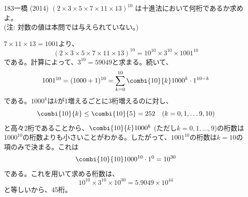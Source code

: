 \begin{prob}{183}{}{一橋 (2014)}
 $(2\times3\times5\times7\times11\times13)^{10}$ は十進法において何桁であるか求めよ。 \\
 (注: 対数の値は本問では与えられていない。)
\end{prob}
$7\times11\times13=1001$より、
\[ (2\times3\times5\times7\times11\times13)^{10}=10^{10}\times3^{10}\times1001^{10} \]
である。計算によって、$3^{10}=59049$と求まる。続いて、
\begin{align*}
 1001^{10}=(1000+1)^{10}=\sum_{k=0}^{10} \combi{10}{k}1000^k\cdot1^{10-k}
\end{align*}
である。$1000^k$は$k$が1増えるごとに3桁増えるのに対し、
\[ \combi{10}{k}\le \combi{10}{5}=252 \quad(k=0,1,\dots 9,10) \]
と高々2桁であることから、$\combi{10}{k}1000^k$ (ただし$k=0,1,\dots, 9$)の桁数は$1000^{10}$の桁数よりも小さいことがわかる。したがって、$1001^{10}$の桁数は$k=10$の項のみで決まる。これは
\[ \combi{10}{10}1000^{10}\cdot1^0=10^{30} \]
である。これを用いて求める桁数は、
\[ 10^{10}\times3^{10}\times10^{30}=5.9049\times10^{44} \]
と等しいから、45桁。
